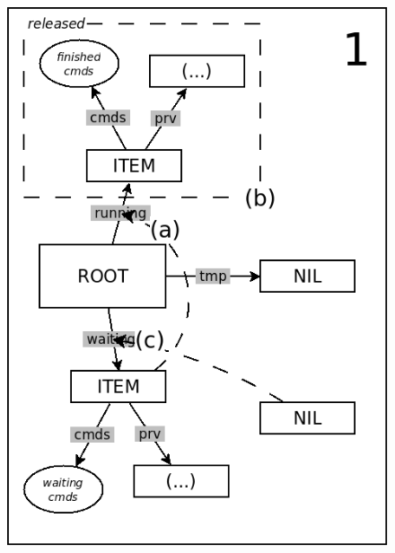 \documentclass{acm_proc_article-sp}
\begin{document}
\begin{figure}
\begin{minipage}[t]{0.24\linewidth}
\includegraphics[scale=0.25]{queue-11.png}
\end{minipage}
\begin{minipage}[t]{0.24\linewidth}
\centering

\end{minipage}
\end{figure}
\end{document}
